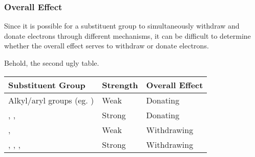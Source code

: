 


	\pagebreak
	\subsubsection{Overall Effect}

		Since it is possible for a substituent group to simultaneously withdraw and donate electrons through different mechanisms,
		it can be difficult to determine whether the overall effect serves to withdraw or donate electrons.

		Behold, the second ugly table.

		\begin{center}\begin{table}[htb]\renewcommand{\arraystretch}{1.5}
		\begin{tabu} to \textwidth {| X[-4,c,m] | X[c,m] | X[c,m] |}

			\hline				Substituent Group					&	Strength	&	Overall Effect	\\

			\hline		Alkyl/aryl groups (eg. )			&	Weak		&		Donating	\\
			\hline		{}, , 				&	Strong		&		Donating 	\\
			\hline		\ch{-\chlorine}, 					&	Weak		&	Withdrawing		\\
			\hline		{}, , , 	&	Strong		&	Withdrawing		\\
			\hline

		\end{tabu}
		\end{table}\end{center}


















